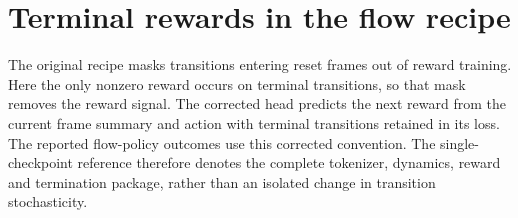 \begin{table}[ht]
\centering
\caption{JEPA geometry and decoded wall intensity for model seed $0$, averaged over $64$
pre-reveal contexts. Distances use matched actions and the same encoder; total residuals include
all latent coordinates. Wall intensity is measured on shared wall pixels.}
\label{tab:latent}
\end{table}

\section{Terminal rewards in the flow recipe}
\label{app:rewardbug}

The original recipe masks transitions entering reset frames out of reward training. Here the only
nonzero reward occurs on terminal transitions, so that mask removes the reward signal.
The corrected head predicts the next reward from the current frame summary and action with
terminal transitions retained in its loss. The reported flow-policy outcomes use this corrected
convention. The single-checkpoint reference therefore denotes the complete tokenizer, dynamics,
reward and termination package, rather than an isolated change in transition stochasticity.
